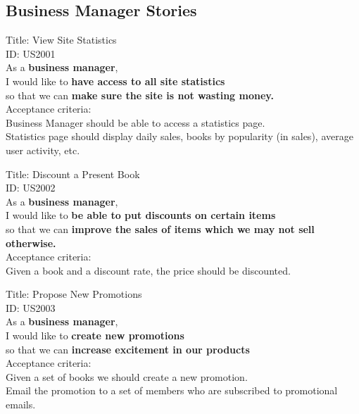 \documentclass{article}
\begin{document}
\subsection{Business Manager Stories}

\begin{framed}
\noindent
Title: View Site Statistics \\
ID: US2001 \\
As a \textbf{business manager},\\
 \textbullet  \quad \quad I would like to \textbf{have access to all site statistics}\\ 
 \textbullet  \quad \quad so that we can \textbf{make sure the site is not wasting money.}\\
 Acceptance criteria: \\
  \textbullet  \quad \quad Business Manager should be able to access a statistics page.\\
  \textbullet  \quad \quad Statistics page should display daily sales, books by popularity (in sales), average user activity, etc.\\
\end{framed}




\begin{framed}
\noindent
Title: Discount a Present Book \\
ID: US2002 \\
As a \textbf{business manager},\\
 \textbullet  \quad \quad I would like to \textbf{be able to put discounts on certain items}\\ 
 \textbullet  \quad \quad so that we can \textbf{improve the sales of items which we may not sell otherwise.}\\
 Acceptance criteria: \\
  \textbullet  \quad \quad Given a book and a discount rate, the price should be discounted.\\
\end{framed}

\begin{framed}
\noindent
Title: Propose New Promotions \\
ID: US2003 \\
As a \textbf{business manager},\\
 \textbullet  \quad \quad I would like to \textbf{create new promotions}\\ 
 \textbullet  \quad \quad so that we can \textbf{increase excitement in our products}\\
 Acceptance criteria: \\
  \textbullet  \quad \quad Given a set of books we should create a new promotion.\\
  \textbullet  \quad \quad Email the promotion to a set of members who are subscribed to promotional emails. \\
\end{framed}
\end{document}
